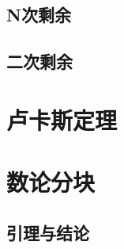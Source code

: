 \documentclass[12pt,a4paper]{article}
\begin{document}
\subsection{N次剩余}
\subsection{二次剩余}

\newpage
\section{卢卡斯定理}

\newpage
\section{数论分块}
\subsection{引理与结论}
\end{document}
